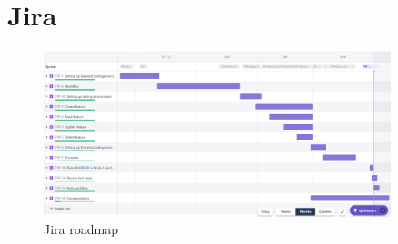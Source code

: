 \appendix

\chapter{Jira}\label{appendix:jira}
\begin{figure}[h!]
    \centering
    \includegraphics[width=0.9\textwidth]{images/jira.png}
    \caption{Jira roadmap}
    \label{image:roadmap}
\end{figure}